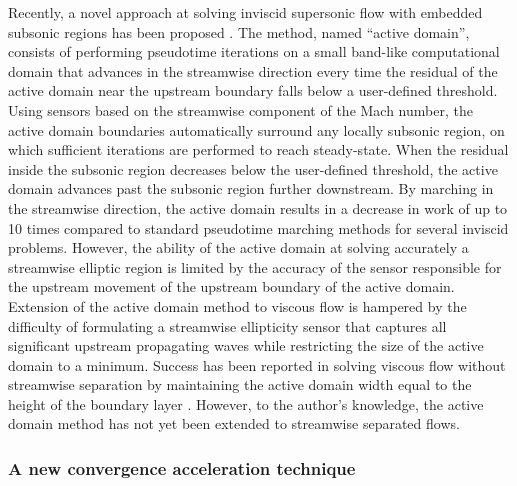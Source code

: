 Recently, a novel approach at solving inviscid supersonic flow with embedded
subsonic regions has been proposed \cite{aiaa:1997:nakahashi}. The method,
named ``active domain'', consists of performing pseudotime iterations
on a small band-like computational domain that advances in the streamwise direction
every time the residual of the active domain near the upstream
boundary falls below a user-defined threshold.
Using sensors based on the streamwise component of the Mach number,
the active domain boundaries automatically surround any
locally subsonic region, on which sufficient iterations are performed to reach
steady-state. When the residual inside the subsonic region decreases below
the user-defined threshold, the active domain advances past the subsonic region
further downstream. By marching in the streamwise direction, the active domain
results in a decrease
in work of up to 10 times compared to standard pseudotime marching methods
for several inviscid problems. However, the ability of the active domain at solving accurately a
streamwise elliptic region is limited by the accuracy of the sensor responsible for the
upstream movement of the upstream boundary of the active domain. Extension
of the active domain method to viscous flow is hampered by the
difficulty of formulating a streamwise ellipticity sensor that captures
all significant upstream propagating waves while restricting the size of
the active domain to a minimum. Success has been reported in solving
viscous flow without streamwise separation by maintaining the active domain
width equal to the height of the boundary layer \cite{aiaaconf:1999:morino}.
However, to the author's knowledge, the active domain method has not yet been extended
to streamwise separated flows.



\subsubsection{A new convergence acceleration technique}

